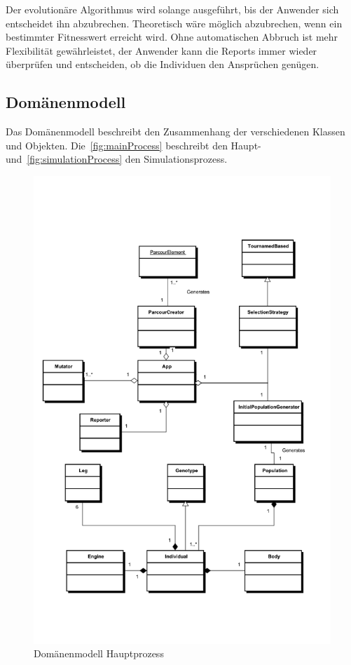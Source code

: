       Der evolutionäre Algorithmus wird solange ausgeführt, bis der Anwender sich entscheidet ihn abzubrechen.
      Theoretisch wäre möglich abzubrechen, wenn ein bestimmter Fitnesswert erreicht wird.
      Ohne automatischen Abbruch ist mehr Flexibilität gewährleistet,
      der Anwender kann die Reports immer wieder überprüfen und entscheiden,
      ob die Individuen den Ansprüchen genügen.

    \subsection{Domänenmodell\label{sub:domMod}}

      Das Domänenmodell beschreibt den Zusammenhang der verschiedenen Klassen und Objekten.
      Die~\vref{fig:mainProcess} beschreibt den Haupt- und~\vref{fig:simulationProcess} den Simulationsprozess.

      \begin{figure}
        \includegraphics[width=\textwidth,center]{graphics/uml/domain-model-main}
        \caption{Domänenmodell Hauptprozess\label{fig:mainProcess}}
      \end{figure}

